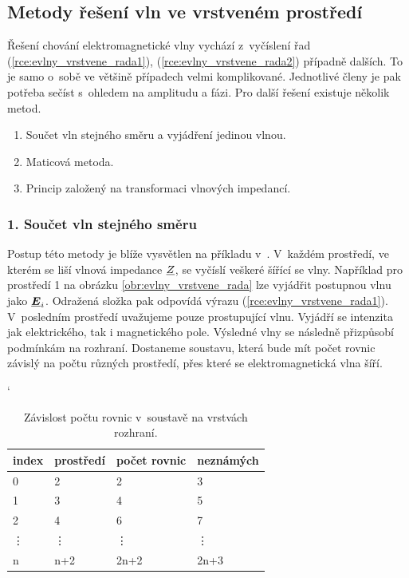 \subsection{Metody řešení vln ve vrstveném prostředí}
Řešení chování elektromagnetické vlny vychází z~vyčíslení řad (\ref{rce:evlny_vrstvene_rada1}), (\ref{rce:evlny_vrstvene_rada2}) případně dalších. To je samo o~sobě ve většině případech velmi komplikované. Jednotlivé členy je pak potřeba sečíst s~ohledem na amplitudu a fázi. Pro další řešení existuje několik metod.
\begin{enumerate}
\item Součet vln stejného směru a vyjádření jedinou vlnou.
\item Maticová metoda.
\item Princip založený na transformaci vlnových impedancí.
\end{enumerate}

\subsubsection*{1. Součet vln stejného směru}
Postup této metody je blíže vysvětlen na příkladu v~\cite[str. 103 - 104]{emp}. V~každém prostředí, ve kterém se liší vlnová impedance ${\underline{Z}}$, se vyčíslí veškeré šířící se vlny. Například pro prostředí 1 na obrázku \ref{obr:evlny_vrstvene_rada} lze vyjádřit postupnou vlnu jako $\mbox{\underline{\boldmath$E$}}_{i}$. Odražená složka pak odpovídá výrazu (\ref{rce:evlny_vrstvene_rada1}). V~posledním prostředí uvažujeme pouze prostupující vlnu. Vyjádří se intenzita jak elektrického, tak i magnetického pole. Výsledné vlny se následně přizpůsobí podmínkám na rozhraní. Dostaneme soustavu, která bude mít počet rovnic závislý na počtu různých prostředí, přes které se elektromagnetická vlna šíří.

\begin{table}[!h]
\catcode` 
\begin{center}
  	\caption{Závislost počtu rovnic v~soustavě na vrstvách rozhraní.}
  	\label{tab:evlny_vrstvene_prostredi}
\begin{tabular}{|l|l|l|l|}
	\hline
	index & prostředí & počet rovnic & neznámých \\
	\hline
	0 & 2 & 2 & 3 \\
	1 & 3 & 4 & 5 \\
	2 & 4 & 6 & 7 \\
	\vdots & \vdots & \vdots & \vdots \\
	n & n+2 & 2n+2 & 2n+3 \\
	\hline
\end{tabular}
\end{center}
\end{table}

